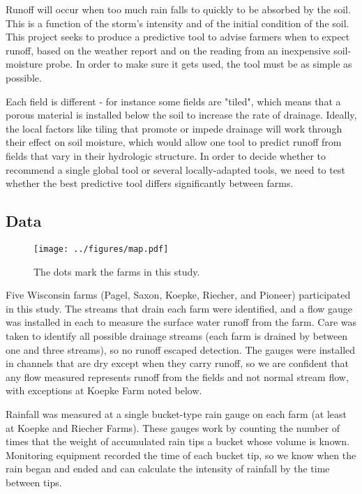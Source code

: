 \documentclass[11pt]{article}
\begin{document}
Runoff will occur when too much rain falls to quickly to be absorbed by the soil. This is a function of the storm's intensity and of the initial condition of the soil. This project seeks to produce a predictive tool to advise farmers when to expect runoff, based on the weather report and on the reading from an inexpensive soil-moisture probe. In order to make sure it gets used, the tool must be as simple as possible.\*

Each field is different - for instance some fields are "tiled", which means that a porous material is installed below the soil to increase the rate of drainage. Ideally, the local factors like tiling that promote or impede drainage will work through their effect on soil moisture, which would allow one tool to predict runoff from fields that vary in their hydrologic structure. In order to decide whether to recommend a single global tool or several locally-adapted tools, we need to test whether the best predictive tool differs significantly between farms.\*

\newpage

\subsection{Data}

\begin{wrapfigure}{r}{0.4\textwidth}
\linespread{1}
 \begin{center}
  \texttt{[image: ../figures/map.pdf]}
  \caption{The dots mark the farms in this study.\label{map}}
 \end{center}
 \linespread{2}
\end{wrapfigure}

Five Wisconsin farms (Pagel, Saxon, Koepke, Riecher, and Pioneer) participated in this study. The streams that drain each farm were identified, and a flow gauge was installed in each to measure the surface water runoff from the farm. Care was taken to identify all possible drainage streams (each farm is drained by between one and three streams), so no runoff escaped detection. The gauges were installed in channels that are dry except when they carry runoff, so we are confident that any flow measured represents runoff from the fields and not normal stream flow, with exceptions at Koepke Farm noted below.\*

Rainfall was measured at a single bucket-type rain gauge on each farm (at least at Koepke and Riecher Farms). These gauges work by counting the number of times that the weight of accumulated rain tips a bucket whose volume is known. Monitoring equipment recorded the time of each bucket tip, so we know when the rain began and ended and can calculate the intensity of rainfall by the time between tips.\*
\end{document}
